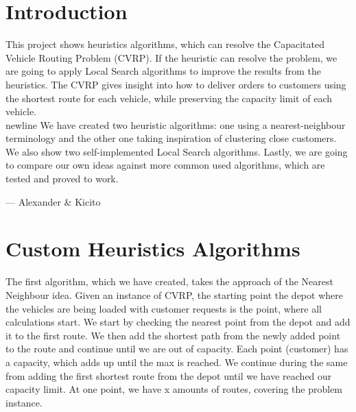 \documentclass[12pt]{article}
\begin{document}

\tableofcontents
\pagebreak


\section{Introduction}

This project shows heuristics algorithms, which can resolve the Capacitated Vehicle Routing Problem (CVRP). If the heuristic can resolve the problem, we are going to apply Local Search algorithms to improve the results from the heuristics. 
The CVRP gives insight into how to deliver orders to customers using the shortest route for each vehicle, while preserving the capacity limit of each vehicle.\\newline
We have created two heuristic algorithms: one using a nearest-neighbour terminology and the other one taking inspiration of clustering close customers. We also show two self-implemented Local Search algorithms. 
Lastly, we are going to compare our own ideas against more common used algorithms, which are tested and proved to work. 

\hspace{1 cm}--- Alexander \& Kicito

\newpage



\section{Custom Heuristics Algorithms}


The first algorithm, which we have created, takes the approach of the Nearest Neighbour idea. Given an instance of CVRP, the starting point \- the depot where the vehicles are being loaded with customer requests \- is the point, where all calculations start. 
We start by checking the nearest point from the depot and add it to the first route. We then add the shortest path from the newly added point to the route and continue until we are out of capacity. Each point (customer) has a capacity, which adds up until the max is reached. We continue during the same from adding the first shortest route from the depot until we have reached our capacity limit. At one point, we have x amounts of routes, covering the problem instance. 
\newline
\end{document}
